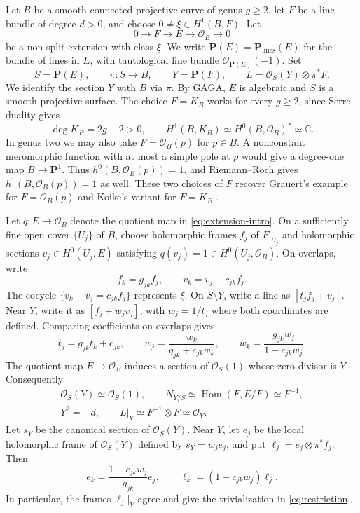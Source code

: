 \documentclass[11pt]{amsart}
\theoremstyle{definition}
\theoremstyle{remark}
\numberwithin{equation}{section}
\newcommand{\C}{\mathbb C}
\newcommand{\PP}{\mathbf P}
\newcommand{\OO}{\mathcal O}
\begin{document}
Let $B$ be a smooth connected projective curve of genus $g\ge2$, let
$F$ be a line bundle of degree $d>0$, and choose
$0\ne\xi\in H^1(B,F)$. Let
\begin{equation}\label{eq:extension-intro}
0\longrightarrow F\longrightarrow E\longrightarrow\OO_B
\longrightarrow0
\end{equation}
be a non-split extension with class $\xi$. We write $\PP(E)=\PP_{\mathrm{lines}}(E)$ for the
bundle of lines in $E$, with tautological line bundle $\OO_{\PP(E)}(-1)$.
Set
\begin{equation}\label{eq:main-line}
 S=\PP(E),\qquad \pi:S\to B,\qquad
 Y=\PP(F),\qquad \boxed{L=\OO_S(Y)\otimes\pi^*F}.
\end{equation}
We identify the section $Y$ with $B$ via $\pi$. By GAGA, $E$ is
algebraic and $S$ is a smooth projective surface. The choice $F=K_B$
works for every $g\ge2$, since Serre duality gives
\[
 \deg K_B=2g-2>0,\qquad
 H^1(B,K_B)\simeq H^0(B,\OO_B)^*\simeq\C.
\]
In genus two we may also take $F=\OO_B(p)$ for $p\in B$.
A nonconstant meromorphic function with at most a simple pole at $p$
would give a degree-one map $B\to\PP^1$. Thus $h^0(B,\OO_B(p))=1$,
and Riemann--Roch gives $h^1(B,\OO_B(p))=1$ as well. These two
choices of $F$ recover Grauert's example for $F=\OO_B(p)$
\cite[\S4, 8(d)]{Grauert1962} and Koike's variant for $F=K_B$
\cite[Example~4.1]{Koike2021}.

Let $q:E\to\OO_B$ denote the quotient map in
\eqref{eq:extension-intro}. On a sufficiently fine open cover
$\{U_j\}$ of $B$, choose holomorphic frames $f_j$ of $F|_{U_j}$
and holomorphic sections $v_j\in H^0(U_j,E)$ satisfying
$q(v_j)=1\in H^0(U_j,\OO_B)$. On overlaps, write
\[
 f_k=g_{jk}f_j,\qquad v_k=v_j+c_{jk}f_j.
\]
The cocycle $\{v_k-v_j=c_{jk}f_j\}$ represents $\xi$.
On $S\setminus Y$, write a line as $[t_jf_j+v_j]$. Near $Y$,
write it as $[f_j+w_jv_j]$, with $w_j=1/t_j$ where both coordinates
are defined. Comparing
coefficients on overlaps gives
\begin{equation}\label{eq:affine-transition}
 t_j=g_{jk}t_k+c_{jk},\qquad
 w_j=\frac{w_k}{g_{jk}+c_{jk}w_k},\qquad
 w_k=\frac{g_{jk}w_j}{1-c_{jk}w_j}.
\end{equation}
The quotient map $E\to\OO_B$ induces a section of
$\OO_S(1)$ whose zero divisor is $Y$. Consequently
\begin{equation}\label{eq:restriction}
 \begin{gathered}
 \OO_S(Y)\simeq\OO_S(1),\qquad
 N_{Y/S}\simeq\operatorname{Hom}(F,E/F)\simeq F^{-1},\\
 Y^2=-d,\qquad L|_Y\simeq F^{-1}\otimes F\simeq\OO_Y.
 \end{gathered}
\end{equation}
Let $s_Y$ be the canonical section of $\OO_S(Y)$. Near $Y$,
let $e_j$ be the local holomorphic frame of $\OO_S(Y)$
defined by $s_Y=w_je_j$, and put
$\ell_j=e_j\otimes\pi^*f_j$. Then
\begin{equation}\label{eq:L-transition}
 e_k=\frac{1-c_{jk}w_j}{g_{jk}}e_j,\qquad
 \ell_k=(1-c_{jk}w_j)\ell_j.
\end{equation}
In particular, the frames $\ell_j|_Y$ agree and give the
trivialization in \eqref{eq:restriction}.
\end{document}
